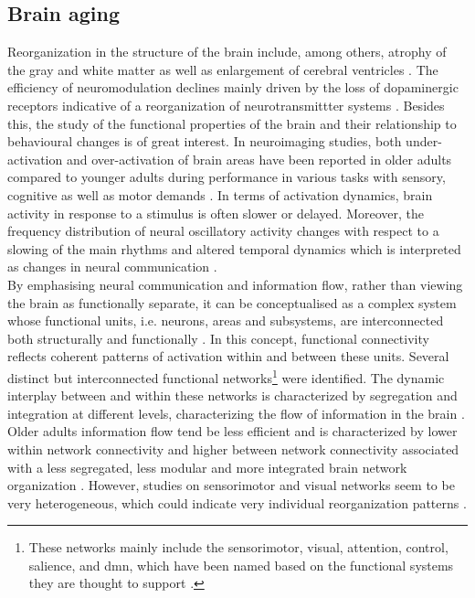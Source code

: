 \subsection{Brain aging}
\label{theory:aging:brain}
Reorganization in the structure of the brain include, among others, atrophy of the gray and white matter as well as enlargement of cerebral ventricles \cite{Fjell2010}. The efficiency of neuromodulation declines mainly driven by the loss of dopaminergic receptors indicative of a reorganization of neurotransmittter systems \cite{Li2001}. Besides this, the study of the functional properties of the brain and their relationship to behavioural changes is of great interest. In neuroimaging studies, both under-activation and over-activation of brain areas have been reported in older adults compared to younger adults during performance in various tasks with sensory, cognitive as well as motor demands \cite{Reuter-Lorenz2010, Sala-Llonch2015}. In terms of activation dynamics, brain activity in response to a stimulus is often slower or delayed. Moreover, the frequency distribution of neural oscillatory activity changes with respect to a slowing of the main rhythms and altered temporal dynamics which is interpreted as changes in neural communication \cite{Courtney2021}.\\ 
By emphasising neural communication and information flow, rather than viewing the brain as functionally separate, it can be conceptualised as a complex system whose functional units, i.e. neurons, areas and subsystems, are interconnected both structurally and functionally \cite{Friston2011,Deery2023}. In this concept, functional connectivity reflects coherent patterns of activation within and between these units. Several distinct but interconnected functional networks\footnote{These networks mainly include the sensorimotor, visual, attention, control, salience, and \gls{dmn}, which have been named based on the functional systems they are thought to support \cite{Uddin2019}.} were identified. The dynamic interplay between and within these networks is characterized by segregation and integration at different levels, characterizing the flow of information in the brain \cite{Sporns2013}. Older adults information flow tend be less efficient and is characterized by lower within network connectivity and higher between network connectivity associated with a less segregated, less modular and more integrated brain network organization \cite{Sala-Llonch2015,Deery2023, Betzel2014}. However, studies on sensorimotor and visual networks seem to be very heterogeneous, which could indicate very individual reorganization patterns \cite{Deery2023}.

